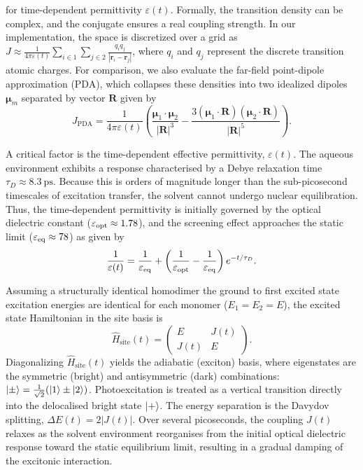 \documentclass[journal=jpclcd, manuscript=letter, layout=twocolumn, doi=true]{achemso}
\begin{document}
for time-dependent permittivity $\varepsilon(t)$.
Formally, the transition density can be complex, and the conjugate ensures a real coupling strength. In our implementation, the space is discretized over a grid as $J \approx\frac{1}{4\pi\varepsilon(t)}\sum_{i\in 1}\sum_{j\in 2}\frac{q_i q_j}{|\mathbf r_i-\mathbf r_j|}$, where $q_i$ and $q_j$ represent the discrete transition atomic charges. For comparison, we also evaluate the far-field point-dipole approximation (PDA), which collapses these densities into two idealized dipoles $\boldsymbol{\mu}_m$ separated by vector $\mathbf{R}$ given by
\begin{equation} \label{eq:J_PD}
    J_{\mathrm{PDA}} = \frac{1}{4\pi\varepsilon(t)} \left( \frac{\boldsymbol{\mu}_1 \cdot \boldsymbol{\mu}_2}{|\mathbf{R}|^3} - \frac{3(\boldsymbol{\mu}_1 \cdot \mathbf{R})(\boldsymbol{\mu}_2 \cdot \mathbf{R})}{|\mathbf{R}|^5} \right) .
\end{equation}

A critical factor is the time-dependent effective permittivity, $\varepsilon(t)$. The aqueous environment exhibits a response characterised by a Debye relaxation time $\tau_D \approx 8.3~\mathrm{ps}$. Because this is orders of magnitude longer than the sub-picosecond timescales of excitation transfer, the solvent cannot undergo nuclear equilibration. Thus, the time-dependent permittivity is initially governed by the optical dielectric constant ($\varepsilon_{\rm opt} \approx 1.78$), and the screening effect approaches the static limit ($\varepsilon_{\rm eq} \approx 78$) as given by
\begin{equation}
    \frac{1}{\varepsilon(t)} = \frac{1}{\varepsilon_{\rm eq}} + \left(\frac{1}{\varepsilon_{\rm opt}} - \frac{1}{\varepsilon_{\rm eq}}\right)e^{-t/\tau_D}.
\end{equation}

Assuming a structurally identical homodimer the ground to first excited state excitation energies are identical for each monomer ($E_1 = E_2 = E$), the excited state Hamiltonian in the site basis is
\begin{equation}
    \hat H_{\text{site}}(t)=\begin{pmatrix} E & J(t) \\ J(t) & E \end{pmatrix}.
\end{equation}
Diagonalizing $\hat H_{\text{site}}(t)$ yields the adiabatic (exciton) basis, where eigenstates are the symmetric (bright) and antisymmetric (dark) combinations: $\ket{\pm} = \frac{1}{\sqrt{2}}(\ket{1} \pm \ket{2})$. Photoexcitation is treated as a vertical transition directly into the delocalised bright state $\ket{+}$. The energy separation is the Davydov splitting, $\Delta E(t) = 2|J(t)|$. Over several picoseconds, the coupling $J(t)$ relaxes as the solvent environment reorganises from the initial optical dielectric response toward the static equilibrium limit, resulting in a gradual damping of the excitonic interaction.
\end{document}
